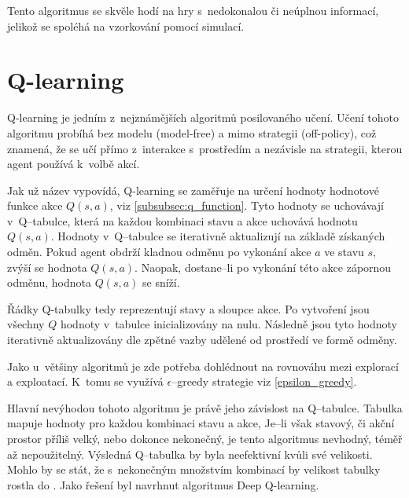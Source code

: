 Tento algoritmus se skvěle hodí na hry s~nedokonalou či neúplnou informací, jelikož se spoléhá na vzorkování pomocí simulací.

\section{Q-learning}\label{subsec:q-learning}

Q-learning je jedním z~nejznámějších algoritmů posilovaného učení.
Učení tohoto algoritmu probíhá bez modelu (model-free) a mimo strategii (off-policy), což znamená, že se učí přímo z~interakce s~prostředím a nezávisle na strategii, kterou agent používá k~volbě akcí.

Jak už název vypovídá, Q-learning se zaměřuje na určení hodnoty hodnotové funkce akce $Q(s, a)$, viz \ref{subsubsec:q_function}.
Tyto hodnoty se uchovávají v~Q--tabulce, která na každou kombinaci stavu a akce uchovává hodnotu $Q(s, a)$.
Hodnoty v~Q--tabulce se iterativně aktualizují na základě získaných odměn.
Pokud agent obdrží kladnou odměnu po vykonání akce $a$ ve stavu $s$, zvýší se hodnota $Q(s, a)$.
Naopak, dostane--li po vykonání této akce zápornou odměnu, hodnota $Q(s, a)$ se sníží.

Řádky Q-tabulky tedy reprezentují stavy a sloupce akce.
Po vytvoření jsou všechny $Q$ hodnoty v~tabulce inicializovány na nulu.
Následně jsou tyto hodnoty iterativně aktualizovány dle zpětné vazby udělené od prostředí ve formě odměny.

Jako u~většiny algoritmů je zde potřeba dohlédnout na rovnováhu mezi explorací a exploatací.
K~tomu se využívá $\epsilon$--greedy strategie viz \ref{epsilon_greedy}.

Hlavní nevýhodou tohoto algoritmu je právě jeho závislost na Q--tabulce.
Tabulka mapuje hodnoty pro každou kombinaci stavu a akce,
Je--li však stavový, či akční prostor příliš velký, nebo dokonce nekonečný, je tento algoritmus nevhodný, téměř až nepoužitelný.
Výsledná Q--tabulka by byla neefektivní kvůli své velikosti.
Mohlo by se stát, že s~nekonečným množstvím kombinací by velikost tabulky rostla do .
Jako řešení byl navrhnut algoritmus Deep Q-learning.

